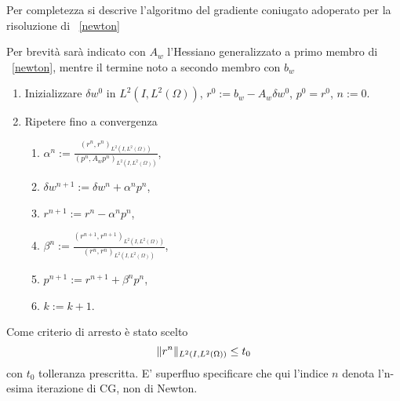 Per completezza si descrive l'algoritmo del gradiente coniugato adoperato per la risoluzione di ~\eqref{newton}
\begin{algoritmo}
\label{cg}
Per brevità sarà indicato con $ A_w $ l'Hessiano generalizzato a primo membro di ~\eqref{newton}, mentre il termine noto a secondo membro con $ b_w $
\begin{enumerate}
\item Inizializzare $ \delta w^0 $ in $ L^2(I,L^2(\Omega)) $, $ r^0:=b_w-A_w\delta w^0 $, $ p^0=r^0 $, $ n:=0 $.
\item Ripetere fino a convergenza
          \begin{enumerate} 
          \item $\alpha^n:=\frac{(r^n,r^n)_{L^2(I,L^2(\Omega))}}{(p^n,A_wp^n)_{L^2(I,L^2(\Omega))}}$,
          \item $\delta w^{n+1}:=\delta w^n + \alpha^np^n$,
          \item $r^{n+1}:=r^n-\alpha^np^n$,
          \item $\beta^n:=\frac{(r^{n+1},r^{n+1})_{L^2(I,L^2(\Omega))}}{(r^n,r^n)_{L^2(I,L^2(\Omega))}}$,
          \item $p^{n+1}:=r^{n+1} + \beta^np^n$,
          \item $k:=k+1$.
          \end{enumerate}
\end{enumerate}
Come criterio di arresto è stato scelto 
\begin{equation}
\lVert r^n\rVert_{L^2(I,L^2(\Omega))}\le t_0 
\label{eq:DNtoll}
\end{equation}
con $ t_0 $ tolleranza prescritta.
E' superfluo specificare che qui l'indice $ n $ denota l'n-esima iterazione di CG, non di Newton.
\label{DN}
\end{algoritmo} 